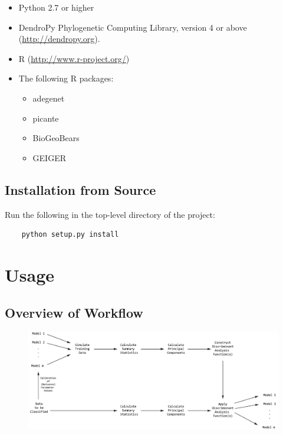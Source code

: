 \documentclass[11pt,openany]{memoir} %
\begin{document}
\begin{itemize}
    \item Python 2.7 or higher
    \item DendroPy Phylogenetic Computing Library, version 4 or above (\url{http://dendropy.org}).
    \item R (\url{http://www.r-project.org/})
    \item The following R packages:
    \begin{itemize}
        \item adegenet
        \item picante
        \item BioGeoBears
        \item GEIGER
    \end{itemize}
\end{itemize}

\section{Installation from Source}

Run the following in the top-level directory of the project:

\begin{lstlisting}
    python setup.py install
\end{lstlisting}


\chapter{Usage}

\section{Overview of Workflow}

\begin{figure}[h!]
    \begin{center}
        \includegraphics[scale=0.5]{figs/flowchart1.pdf}
    \end{center}
\end{figure}
\end{document}
